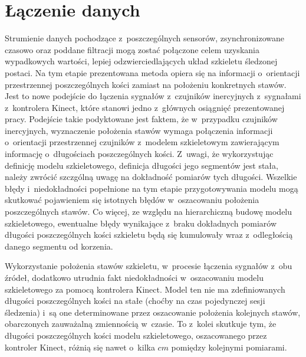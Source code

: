 \section{Łączenie danych}
										
Strumienie danych pochodzące z~poszczególnych sensorów, zsynchronizowane czasowo oraz poddane filtracji mogą zostać połączone celem uzyskania wypadkowych wartości, lepiej odzwierciedlających układ szkieletu śledzonej postaci. Na tym etapie prezentowana metoda opiera się na informacji o~orientacji przestrzennej poszczególnych kości zamiast na położeniu konkretnych stawów. Jest to nowe podejście do łączenia sygnałów z~czujników inercyjnych z~sygnałami z~kontrolera Kinect, które stanowi jedno z~głównych osiągnięć prezentowanej pracy. Podejście takie podyktowane jest faktem, że w~przypadku czujników inercyjnych, wyznaczenie położenia stawów wymaga połączenia informacji o~orientacji przestrzennej czujników z~modelem szkieletowym zawierającym informację o~długościach poszczególnych kości. Z~uwagi, że wykorzystując definicję modelu szkieletowego, definicja długości jego segmentów jest stała, należy zwrócić szczgólną uwagę na dokładność pomiarów tych długości. Wszelkie błędy i~niedokładności popełnione na tym etapie przygotowywania modelu mogą skutkować pojawieniem się istotnych błędów w~oszacowaniu położenia poszczególnych stawów. Co więcej, ze względu na hierarchiczną budowę modelu szkieletowego, ewentualne błędy wynikające z~braku dokładnych pomiarów długości poszczególnych kości szkieletu będą się kumulowały wraz z~odległością danego segmentu od korzenia. 

Wykorzystanie położenia stawów szkieletu, w~procesie łączenia sygnałów z~obu źródeł, dodatkowo utrudnia fakt niedokładności w~oszacowaniu modelu szkieletowego za pomocą kontrolera Kinect. Model ten nie ma zdefiniowanych długości poszczególnych kości na stałe (choćby na czas pojedynczej sesji śledzenia) i~są one determinowane przez oszacowanie położenia kolejnych stawów, obarczonych zauważalną zmiennością w~czasie. To z~kolei skutkuje tym, że długości poszczególnych kości modelu szkieletowego, oszacowanego przez kontroler Kinect, różnią się nawet o~kilka $cm$ pomiędzy kolejnymi pomiarami.
										
